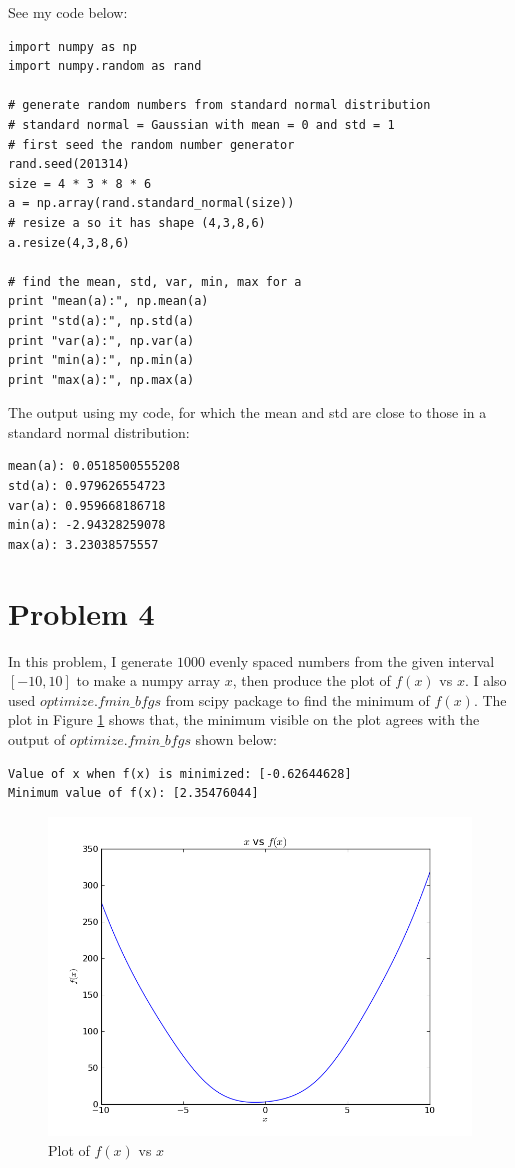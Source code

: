 See my code below: 

\begin{verbatim}
import numpy as np
import numpy.random as rand

# generate random numbers from standard normal distribution
# standard normal = Gaussian with mean = 0 and std = 1
# first seed the random number generator
rand.seed(201314)
size = 4 * 3 * 8 * 6
a = np.array(rand.standard_normal(size))
# resize a so it has shape (4,3,8,6)
a.resize(4,3,8,6)

# find the mean, std, var, min, max for a
print "mean(a):", np.mean(a)
print "std(a):", np.std(a)
print "var(a):", np.var(a)
print "min(a):", np.min(a)
print "max(a):", np.max(a)
\end{verbatim} 


The output using my code, for which the mean and std are close to those in a standard normal distribution:
\begin{verbatim}
mean(a): 0.0518500555208
std(a): 0.979626554723
var(a): 0.959668186718
min(a): -2.94328259078
max(a): 3.23038575557
\end{verbatim}


\section*{Problem 4}
In this problem, I generate $1000$ evenly spaced numbers from the given interval $[-10,10]$ to make a numpy array $x$, then produce the plot of $f(x)$ vs $x$. I also used $optimize.fmin\_bfgs$ from scipy package to find the minimum of $f(x)$. The plot in Figure \ref{fmin} shows that, the minimum visible on the plot agrees with the output of $optimize.fmin\_bfgs$ shown below: 
\begin{verbatim}
Value of x when f(x) is minimized: [-0.62644628] 
Minimum value of f(x): [2.35476044]
\end{verbatim}

\begin{figure}[htb]
\centering
\includegraphics[width=15cm]{hw3p4.png}
\caption{Plot of $f(x)$ vs $x$}
\label{fmin}
\end{figure}


